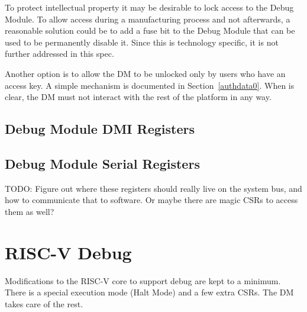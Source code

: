 \documentclass{article}
\begin{document}
To protect intellectual property it may be desirable to lock access to the
Debug Module.  To allow access during a manufacturing process and not
afterwards, a reasonable solution could be to add a fuse bit to the Debug
Module that can be used to be permanently disable it. Since this is technology
specific, it is not further addressed in this spec.

Another option is to allow the DM to be unlocked only by users who  have an
access key. A simple mechanism is documented in Section~\ref{authdata0}. When
\Fauthenticated is clear, the DM must not interact with the rest of the
platform in any way.

\subsection{Debug Module DMI Registers} \label{dmdebbus}



\subsection{Debug Module Serial Registers} \label{dmsysbus}

TODO: Figure out where these registers should really live on the system bus,
and how to communicate that to software. Or maybe there are magic CSRs to
access them as well?



%
%

\section{RISC-V Debug}

Modifications to the RISC-V core to support debug are kept to a minimum.  There
is a special execution mode (Halt Mode) and a few extra CSRs. The DM takes care
of the rest.
\end{document}
